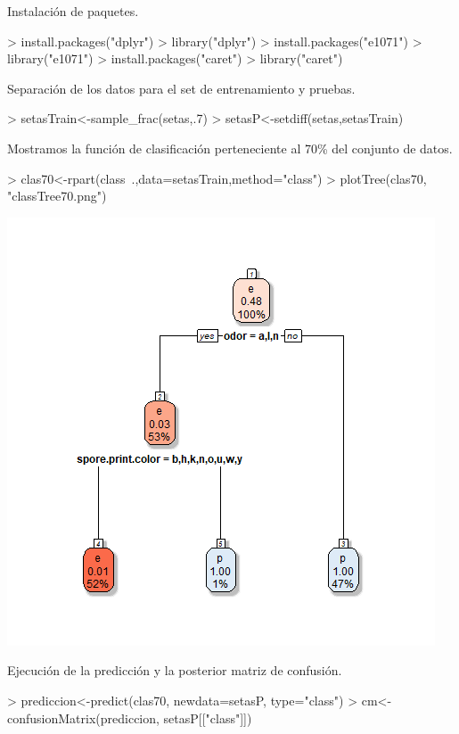 \documentclass [a4paper] {article}
\begin{document}
\bigskip
Instalación de paquetes.
\begin{Schunk}
\begin{Sinput}
> install.packages("dplyr")
> library("dplyr")
> install.packages("e1071")
> library("e1071")
> install.packages("caret")
> library("caret")
\end{Sinput}
\end{Schunk}

\bigskip
Separación de los datos para el set de entrenamiento y pruebas.
\begin{Schunk}
\begin{Sinput}
> setasTrain<-sample_frac(setas,.7)
> setasP<-setdiff(setas,setasTrain)
\end{Sinput}
\end{Schunk}

\bigskip
Mostramos la función de clasificación perteneciente al 70\% del conjunto de datos.
\begin{Schunk}
\begin{Sinput}
> clas70<-rpart(class~.,data=setasTrain,method="class")
> plotTree(clas70, "classTree70.png")
\end{Sinput}
\end{Schunk}
\includegraphics[width=\textwidth]{classTree70}

\bigskip
Ejecución de la predicción y la posterior matriz de confusión.
\begin{Schunk}
\begin{Sinput}
> prediccion<-predict(clas70, newdata=setasP, type="class")
> cm<-confusionMatrix(prediccion, setasP[["class"]])
\end{Sinput}
\end{Schunk}
\end{document}
